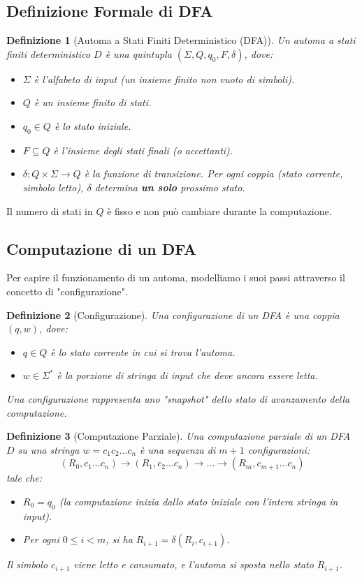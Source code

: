 \documentclass[a4paper]{article}
\newtheorem{definition}{Definizione}[section]
\begin{document}
\subsection{Definizione Formale di DFA}
\begin{definition}[Automa a Stati Finiti Deterministico (DFA)]
Un automa a stati finiti deterministico $D$ è una quintupla $( \Sigma, Q, q_0, F, \delta )$, dove:
\begin{itemize}
    \item $\Sigma$ è l'alfabeto di input (un insieme finito non vuoto di simboli).
    \item $Q$ è un insieme finito di stati.
    \item $q_0 \in Q$ è lo stato iniziale.
    \item $F \subseteq Q$ è l'insieme degli stati finali (o accettanti).
    \item $\delta: Q \times \Sigma \to Q$ è la funzione di transizione. Per ogni coppia (stato corrente, simbolo letto), $\delta$ determina \textbf{un solo} prossimo stato.
\end{itemize}
\end{definition}
Il numero di stati in $Q$ è fisso e non può cambiare durante la computazione.

\subsection{Computazione di un DFA}
Per capire il funzionamento di un automa, modelliamo i suoi passi attraverso il concetto di "configurazione".

\begin{definition}[Configurazione]
Una \emph{configurazione} di un DFA è una coppia $(q, w)$, dove:
\begin{itemize}
    \item $q \in Q$ è lo stato corrente in cui si trova l'automa.
    \item $w \in \Sigma^*$ è la porzione di stringa di input che deve ancora essere letta.
\end{itemize}
Una configurazione rappresenta uno "snapshot" dello stato di avanzamento della computazione.
\end{definition}

\begin{definition}[Computazione Parziale]
Una \emph{computazione parziale} di un DFA $D$ su una stringa $w = c_1 c_2 \dots c_n$ è una sequenza di $m+1$ configurazioni:
\[ (R_0, c_1 \dots c_n) \xrightarrow{} (R_1, c_2 \dots c_n) \xrightarrow{} \dots \xrightarrow{} (R_m, c_{m+1} \dots c_n) \]
tale che:
\begin{itemize}
    \item $R_0 = q_0$ (la computazione inizia dallo stato iniziale con l'intera stringa in input).
    \item Per ogni $0 \leq i < m$, si ha $R_{i+1} = \delta(R_i, c_{i+1})$.
\end{itemize}
Il simbolo $c_{i+1}$ viene letto e consumato, e l'automa si sposta nello stato $R_{i+1}$.
\end{definition}
\end{document}

